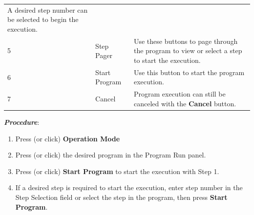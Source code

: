 \begin{longtable}[]{@{}lll@{}}
\begin{minipage}[t]{0.65\columnwidth}
A desired step number can be selected to begin the execution.\strut
\end{minipage}\tabularnewline
\begin{minipage}[t]{0.04\columnwidth}\raggedright
5\strut
\end{minipage} & \begin{minipage}[t]{0.23\columnwidth}\raggedright
Step Pager\strut
\end{minipage} & \begin{minipage}[t]{0.65\columnwidth}\raggedright
Use these buttons to page through the program to view or select a step
to start the execution.\strut
\end{minipage}\tabularnewline
\begin{minipage}[t]{0.04\columnwidth}\raggedright
6\strut
\end{minipage} & \begin{minipage}[t]{0.23\columnwidth}\raggedright
Start Program\strut
\end{minipage} & \begin{minipage}[t]{0.65\columnwidth}\raggedright
Use this button to start the program execution.\strut
\end{minipage}\tabularnewline
\begin{minipage}[t]{0.04\columnwidth}\raggedright
7\strut
\end{minipage} & \begin{minipage}[t]{0.23\columnwidth}\raggedright
Cancel\strut
\end{minipage} & \begin{minipage}[t]{0.65\columnwidth}\raggedright
Program execution can still be canceled with the \textbf{Cancel}
button.\strut
\end{minipage}\tabularnewline
\bottomrule
\end{longtable}

\textbf{\emph{Procedure}}:

\begin{enumerate}
\def\labelenumi{\arabic{enumi}.}
\tightlist
\item
  Press (or click) \textbf{Operation Mode}
\item
  Press (or click) the desired program in the Program Run panel.
\item
  Press (or click) \textbf{Start Program} to start the execution with
  Step 1.
\item
  If a desired step is required to start the execution, enter step
  number in the Step Selection field or select the step in the program,
  then press \textbf{Start Program}.
\end{enumerate}

